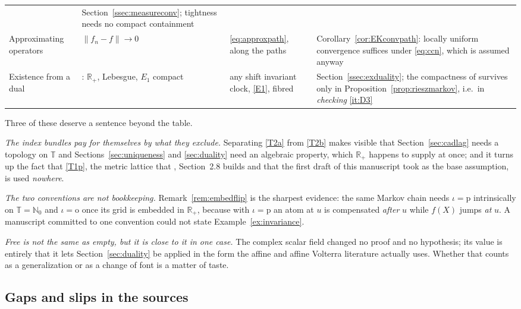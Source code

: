 \documentclass[11pt,a4paper]{article}
\theoremstyle{plain}
\theoremstyle{definition}
\theoremstyle{remark}
\newcommand{\R}{\mathbb{R}}
\newcommand{\N}{\mathbb{N}}
\newcommand{\Rp}{\R_+}
\newcommand{\T}{\mathbb{T}}                     %
\newcommand{\DGP}{\cite{DGP24}}
\newcommand{\EK}{\cite{EK86}}
\newcommand{\MZ}{\cite{MZ84}}
\begin{document}
\begin{tabular}{@{}p{}p{}p{}p{}@{}}
  & Section~\ref{ssec:measureconv}; \MZ{} tightness needs no compact
    containment \\
Approximating operators
  & $\lVert f_n - f\rVert \to 0$
  & \eqref{eq:approxpath}, along the paths
  & Corollary~\ref{cor:EKconvpath}: locally uniform convergence suffices under
    \eqref{eq:ccn}, which is assumed anyway \\
Existence from a dual
  & \DGP: $\Rp$, Lebesgue, $E_1$ compact
  & any shift invariant clock, \eqref{E1}, fibred
  & Section~\ref{ssec:exduality}; the compactness of \DGP{} survives only in
    Proposition~\ref{prop:rieszmarkov}, i.e.\ in \emph{checking} \ref{it:D3} \\
\bottomrule
\end{tabular}

\medskip
\noindent
Three of these deserve a sentence beyond the table.

\emph{The index bundles pay for themselves by what they exclude.}  Separating
\eqref{T2a} from \eqref{T2b} makes visible that Section~\ref{sec:cadlag} needs a topology on
$\T$ and Sections~\ref{sec:uniqueness} and \ref{sec:duality} need an algebraic
property, which $\Rp$ happens to supply at once; and it turns up the fact that
\eqref{T1p}, the metric lattice that \EK, Section~2.8 builds and that the first
draft of this manuscript took as the base assumption, is used \emph{nowhere}.

\emph{The two conventions are not bookkeeping.}  Remark~\ref{rem:embedflip} is
the sharpest evidence: the same Markov chain needs $\iota = \mathrm{p}$
intrinsically on $\T = \N_0$ and $\iota = \mathrm{o}$ once its grid is embedded
in $\Rp$, because with $\iota = \mathrm{p}$ an atom at $u$ is compensated
\emph{after} $u$ while $f(X)$ jumps \emph{at} $u$.  A manuscript committed to one
convention could not state Example~\ref{ex:invariance}.

\emph{Free is not the same as empty, but it is close to it in one case.}  The
complex scalar field changed no proof and no hypothesis; its value is entirely
that it lets Section~\ref{sec:duality} be applied in the form the affine and
affine Volterra literature actually uses.  Whether that counts as a
generalization or as a change of font is a matter of taste.

\subsection{Gaps and slips in the sources}
\label{ssec:addedcorrections}
\end{document}
